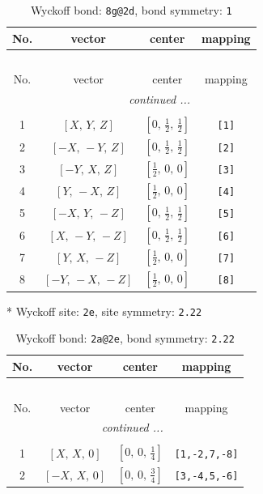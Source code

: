 \documentclass[fleqn,8pt]{jsarticle}
\begin{document}
\begin{longtable}{cccc}
\caption{Wyckoff bond: {\tt 8g@2d}, bond symmetry: {\tt 1}}
 \\
 \hline \hline
No. & vector & center & mapping \\ \hline \endfirsthead

\multicolumn{3}{l}{\tablename\ \thetable{}} \\
 \hline \hline
No. & vector & center & mapping \\ \hline \endhead

 \hline \hline
\multicolumn{3}{r}{\footnotesize\it continued ...} \\ \endfoot

 \hline \hline
\multicolumn{3}{r}{} \\ \endlastfoot

1 & $\left[ X,\, Y,\, Z \right]$ & $\left[ 0,\, \frac{1}{2},\, \frac{1}{2} \right]$ & {\tt [1]} \\ \hline
2 & $\left[ - X,\, - Y,\, Z \right]$ & $\left[ 0,\, \frac{1}{2},\, \frac{1}{2} \right]$ & {\tt [2]} \\ \hline
3 & $\left[ - Y,\, X,\, Z \right]$ & $\left[ \frac{1}{2},\, 0,\, 0 \right]$ & {\tt [3]} \\ \hline
4 & $\left[ Y,\, - X,\, Z \right]$ & $\left[ \frac{1}{2},\, 0,\, 0 \right]$ & {\tt [4]} \\ \hline
5 & $\left[ - X,\, Y,\, - Z \right]$ & $\left[ 0,\, \frac{1}{2},\, \frac{1}{2} \right]$ & {\tt [5]} \\ \hline
6 & $\left[ X,\, - Y,\, - Z \right]$ & $\left[ 0,\, \frac{1}{2},\, \frac{1}{2} \right]$ & {\tt [6]} \\ \hline
7 & $\left[ Y,\, X,\, - Z \right]$ & $\left[ \frac{1}{2},\, 0,\, 0 \right]$ & {\tt [7]} \\ \hline
8 & $\left[ - Y,\, - X,\, - Z \right]$ & $\left[ \frac{1}{2},\, 0,\, 0 \right]$ & {\tt [8]} \\
\end{longtable}
* Wyckoff site: {\tt 2e}, site symmetry: {\tt 2.22}
\renewcommand{\arraystretch}{1.2}
\begin{longtable}{cccc}
\caption{Wyckoff bond: {\tt 2a@2e}, bond symmetry: {\tt 2.22}}
 \\
 \hline \hline
No. & vector & center & mapping \\ \hline \endfirsthead

\multicolumn{3}{l}{\tablename\ \thetable{}} \\
 \hline \hline
No. & vector & center & mapping \\ \hline \endhead

 \hline \hline
\multicolumn{3}{r}{\footnotesize\it continued ...} \\ \endfoot

 \hline \hline
\multicolumn{3}{r}{} \\ \endlastfoot

1 & $\left[ X,\, X,\, 0 \right]$ & $\left[ 0,\, 0,\, \frac{1}{4} \right]$ & {\tt [1,-2,7,-8]} \\ \hline
2 & $\left[ - X,\, X,\, 0 \right]$ & $\left[ 0,\, 0,\, \frac{3}{4} \right]$ & {\tt [3,-4,5,-6]} \\
\end{longtable}
\end{document}
